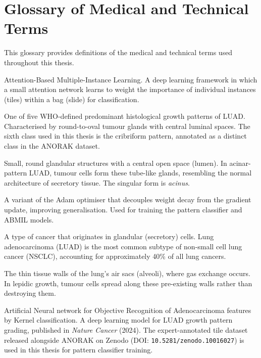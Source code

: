 \chapter{Glossary of Medical and Technical Terms}
\label{app:glossary}

This glossary provides definitions of the medical and technical terms used throughout this thesis.

\begin{description}[style=nextline,leftmargin=4cm]

\item[ABMIL] Attention-Based Multiple-Instance Learning.  A deep learning framework in which a small attention network learns to weight the importance of individual instances (tiles) within a bag (slide) for classification.


\item[Acinar pattern] One of five WHO-defined predominant histological growth patterns of LUAD.  Characterised by round-to-oval tumour glands with central luminal spaces.  The sixth class used in this thesis is the cribriform pattern, annotated as a distinct class in the ANORAK dataset.


\item[Acini] Small, round glandular structures with a central open space (lumen).  In acinar-pattern LUAD, tumour cells form these tube-like glands, resembling the normal architecture of secretory tissue.  The singular form is \emph{acinus}.


\item[AdamW] A variant of the Adam optimiser that decouples weight decay from the gradient update, improving generalisation.  Used for training the pattern classifier and ABMIL models.


\item[Adenocarcinoma] A type of cancer that originates in glandular (secretory) cells.  Lung adenocarcinoma (LUAD) is the most common subtype of non-small cell lung cancer (NSCLC), accounting for approximately 40\% of all lung cancers.


\item[Alveolar walls / septa] The thin tissue walls of the lung's air sacs (alveoli), where gas exchange occurs.  In lepidic growth, tumour cells spread along these pre-existing walls rather than destroying them.


\item[ANORAK] Artificial Neural network for Objective Recognition of Adenocarcinoma features by Kernel classification.  A deep learning model for LUAD growth pattern grading, published in \emph{Nature Cancer} (2024).  The expert-annotated tile dataset released alongside ANORAK on Zenodo (DOI: \texttt{10.5281/zenodo.10016027}) is used in this thesis for pattern classifier training.



\end{description}
